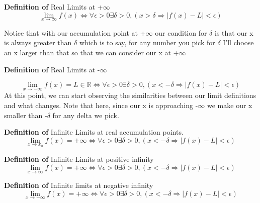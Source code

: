 \documentclass[12pt]{article}
\theoremstyle{definition}
\newenvironment{definition}{\vspace{1em}\noindent\textbf{Definition of}}{\vspace{1em}}
\begin{document}
\begin{definition}
  Real Limits at +$\infty$
   \[ \lim_{x\to\infty } f(x) \iff \forall \epsilon > 0 \exists \delta > 0,( x > \delta \Rightarrow \mid f(x) - L \mid < \epsilon )\]	

   Notice that with our accumulation point at +$\infty$ our condition for $\delta$ is that our x is always greater than $\delta$ which is to say, for any number you pick for $\delta$ I'll choose an x larger than that so that we can consider our x at +$\infty$




\end{definition}

\begin{definition}
 Real Limits at -$\infty$ 

 \[ \lim_{x\to -\infty } f(x) = L \in \mathbb{R} \iff \forall \epsilon > 0 \exists \delta > 0,( x < -\delta \Rightarrow \mid f(x) - L \mid < \epsilon )\]	
At this point, we can start observing the similarities between our limit definitions and what changes. Note that here, since our x is approaching -$\infty$ we make our x smaller than -$\delta$ for any delta we pick.

\end{definition}


\begin{definition}
Infinite Limits at real accumulation points.
  \[ \lim_{x\to x_0 } f(x) = +\infty \iff \forall \epsilon > 0 \exists \delta > 0,( x < -\delta \Rightarrow \mid f(x) - L \mid < \epsilon )\]	



\end{definition}

\begin{definition}
  Infinite Limits at positive infinity
  \[ \lim_{x\to \infty } f(x) = +\infty \iff \forall \epsilon > 0 \exists \delta > 0,( x < -\delta \Rightarrow \mid f(x) - L \mid < \epsilon )\]	


\end{definition}

\begin{definition}
Infinite limits at negative infinity
  \[ \lim_{x\to -\infty } f(x) = +\infty \iff \forall \epsilon > 0 \exists \delta > 0,( x < -\delta \Rightarrow \mid f(x) - L \mid < \epsilon )\]	



\end{definition}
\end{document}
